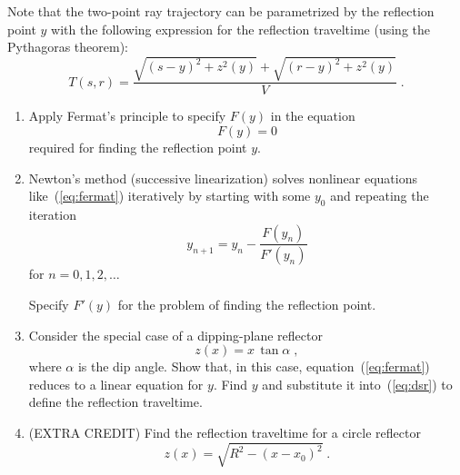 \begin{enumerate}

  Note that the two-point ray trajectory can be parametrized by the
  reflection point $y$ with the following expression for the
  reflection traveltime (using the Pythagoras theorem):
  \begin{equation}
      T(s,r) = {\frac{\sqrt{(s-y)^2+z^2(y)}+\sqrt{(r-y)^2+z^2(y)}}{V}}\;.
      \label{eq:dsr}
  \end{equation}

  \begin{enumerate}
  \item Apply Fermat's principle to specify $F(y)$ in the equation
    \begin{equation}
	\label{eq:fermat}
	    F(y) = 0
      \end{equation}
      required for finding the reflection point $y$.

    \item Newton's method (successive linearization) solves nonlinear
    equations like~(\ref{eq:fermat}) iteratively by starting with some
    $y_0$ and repeating the iteration
      \begin{equation}
      \label{eq:newton}
        y_{n+1} = y_n - \frac{F(y_n)}{F'(y_n)}
      \end{equation}
      for $n=0,1,2,\ldots$ 

      Specify $F'(y)$ for the problem of finding the reflection point.

    \item Consider the special case of a dipping-plane reflector 
\begin{equation}
\label{eq:plane}
z(x) = x\,\tan{\alpha}\;,
\end{equation}
 where $\alpha$ is the dip angle. Show that, in
    this case, equation~(\ref{eq:fermat}) reduces to a linear equation
    for $y$. Find $y$ and substitute it into~(\ref{eq:dsr}) to define the 
    reflection traveltime.

\item (EXTRA CREDIT) Find the reflection traveltime for a circle reflector
\begin{equation}
\label{eq:circle}
z(x) = \sqrt{R^2 - (x-x_0)^2}\;.
\end{equation}

\end{enumerate}
\end{enumerate}

